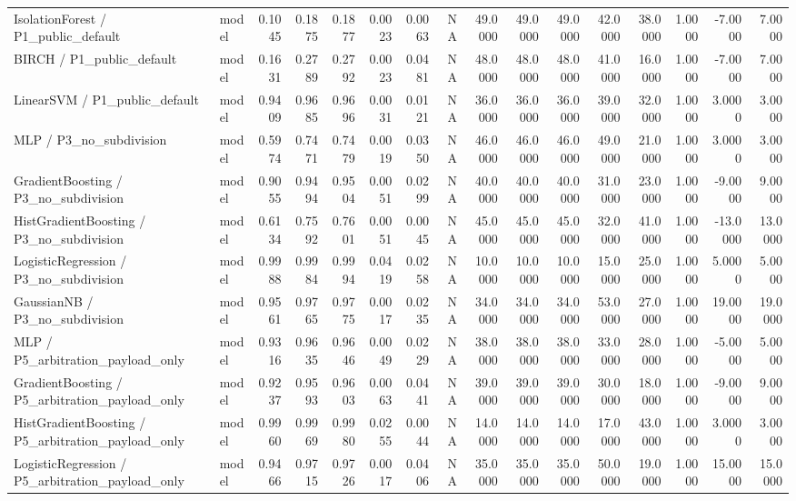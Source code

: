 \begin{tabular}{llrrrrrrrrrrrrrr}
IsolationForest / P1\_public\_default & model & 0.1045 & 0.1875 & 0.1877 & 0.0023 & 0.0063 & NA & 49.0000 & 49.0000 & 49.0000 & 42.0000 & 38.0000 & 1.0000 & -7.0000 & 7.0000 \\
BIRCH / P1\_public\_default & model & 0.1631 & 0.2789 & 0.2792 & 0.0023 & 0.0481 & NA & 48.0000 & 48.0000 & 48.0000 & 41.0000 & 16.0000 & 1.0000 & -7.0000 & 7.0000 \\
LinearSVM / P1\_public\_default & model & 0.9409 & 0.9685 & 0.9696 & 0.0031 & 0.0121 & NA & 36.0000 & 36.0000 & 36.0000 & 39.0000 & 32.0000 & 1.0000 & 3.0000 & 3.0000 \\
MLP / P3\_no\_subdivision & model & 0.5974 & 0.7471 & 0.7479 & 0.0019 & 0.0350 & NA & 46.0000 & 46.0000 & 46.0000 & 49.0000 & 21.0000 & 1.0000 & 3.0000 & 3.0000 \\
GradientBoosting / P3\_no\_subdivision & model & 0.9055 & 0.9494 & 0.9504 & 0.0051 & 0.0299 & NA & 40.0000 & 40.0000 & 40.0000 & 31.0000 & 23.0000 & 1.0000 & -9.0000 & 9.0000 \\
HistGradientBoosting / P3\_no\_subdivision & model & 0.6134 & 0.7592 & 0.7601 & 0.0051 & 0.0045 & NA & 45.0000 & 45.0000 & 45.0000 & 32.0000 & 41.0000 & 1.0000 & -13.0000 & 13.0000 \\
LogisticRegression / P3\_no\_subdivision & model & 0.9988 & 0.9984 & 0.9994 & 0.0419 & 0.0258 & NA & 10.0000 & 10.0000 & 10.0000 & 15.0000 & 25.0000 & 1.0000 & 5.0000 & 5.0000 \\
GaussianNB / P3\_no\_subdivision & model & 0.9561 & 0.9765 & 0.9775 & 0.0017 & 0.0235 & NA & 34.0000 & 34.0000 & 34.0000 & 53.0000 & 27.0000 & 1.0000 & 19.0000 & 19.0000 \\
MLP / P5\_arbitration\_payload\_only & model & 0.9316 & 0.9635 & 0.9646 & 0.0049 & 0.0229 & NA & 38.0000 & 38.0000 & 38.0000 & 33.0000 & 28.0000 & 1.0000 & -5.0000 & 5.0000 \\
GradientBoosting / P5\_arbitration\_payload\_only & model & 0.9237 & 0.9593 & 0.9603 & 0.0063 & 0.0441 & NA & 39.0000 & 39.0000 & 39.0000 & 30.0000 & 18.0000 & 1.0000 & -9.0000 & 9.0000 \\
HistGradientBoosting / P5\_arbitration\_payload\_only & model & 0.9960 & 0.9969 & 0.9980 & 0.0255 & 0.0044 & NA & 14.0000 & 14.0000 & 14.0000 & 17.0000 & 43.0000 & 1.0000 & 3.0000 & 3.0000 \\
LogisticRegression / P5\_arbitration\_payload\_only & model & 0.9466 & 0.9715 & 0.9726 & 0.0017 & 0.0406 & NA & 35.0000 & 35.0000 & 35.0000 & 50.0000 & 19.0000 & 1.0000 & 15.0000 & 15.0000 \\

\end{tabular}

